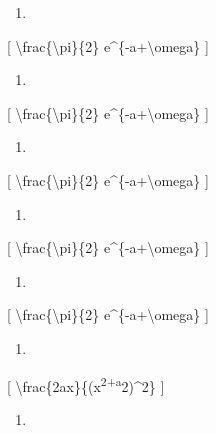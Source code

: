 \documentclass[
]{article}
\providecommand{\tightlist}{%
  \setlength{\itemsep}{0pt}\setlength{\parskip}{0pt}}
\begin{document}
\begin{enumerate}
\def\labelenumi{\arabic{enumi}.}
\setcounter{enumi}{10}
\tightlist
\item
\end{enumerate}

{[} \textbackslash frac\{\textbackslash pi\}\{2\}
e\^{}\{-a+\textbackslash omega\} {]}

\begin{enumerate}
\def\labelenumi{\arabic{enumi}.}
\setcounter{enumi}{11}
\tightlist
\item
\end{enumerate}

{[} \textbackslash frac\{\textbackslash pi\}\{2\}
e\^{}\{-a+\textbackslash omega\} {]}

\begin{enumerate}
\def\labelenumi{\arabic{enumi}.}
\setcounter{enumi}{12}
\tightlist
\item
\end{enumerate}

{[} \textbackslash frac\{\textbackslash pi\}\{2\}
e\^{}\{-a+\textbackslash omega\} {]}

\begin{enumerate}
\def\labelenumi{\arabic{enumi}.}
\setcounter{enumi}{13}
\tightlist
\item
\end{enumerate}

{[} \textbackslash frac\{\textbackslash pi\}\{2\}
e\^{}\{-a+\textbackslash omega\} {]}

\begin{enumerate}
\def\labelenumi{\arabic{enumi}.}
\setcounter{enumi}{14}
\tightlist
\item
\end{enumerate}

{[} \textbackslash frac\{\textbackslash pi\}\{2\}
e\^{}\{-a+\textbackslash omega\} {]}

\begin{enumerate}
\def\labelenumi{\arabic{enumi}.}
\setcounter{enumi}{15}
\tightlist
\item
\end{enumerate}

{[} \textbackslash frac\{2ax\}\{(x\textsuperscript{2+a}2)\^{}2\} {]}

\begin{enumerate}
\def\labelenumi{\arabic{enumi}.}
\setcounter{enumi}{16}
\tightlist
\item
\end{enumerate}
\end{document}
